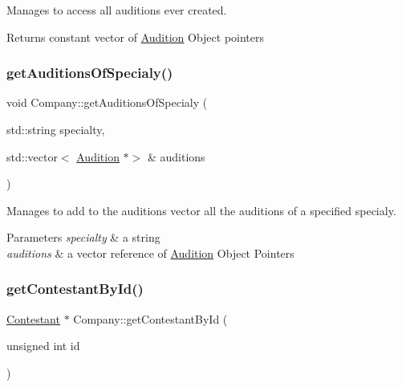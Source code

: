 Manages to access all auditions ever created. 

\begin{DoxyReturn}{Returns}
constant vector of \hyperlink{class_audition}{Audition} Object pointers 
\end{DoxyReturn}
\mbox{\label{class_company_a9740e4c34fac69951145e289269fabdb}} 
\subsubsection{\texorpdfstring{get\+Auditions\+Of\+Specialy()}{getAuditionsOfSpecialy()}}
{\footnotesize\ttfamily void Company\+::get\+Auditions\+Of\+Specialy (\begin{DoxyParamCaption}\item[{std\+::string}]{specialty,  }\item[{std\+::vector$<$ \hyperlink{class_audition}{Audition} $\ast$$>$ \&}]{auditions }\end{DoxyParamCaption})}



Manages to add to the auditions vector all the auditions of a specified specialy. 


\begin{DoxyParams}{Parameters}
{\em specialty} & a string \\
\hline
{\em auditions} & a vector reference of \hyperlink{class_audition}{Audition} Object Pointers \\
\hline
\end{DoxyParams}
\mbox{\label{class_company_a9a633866abe6cc598bb290498dc3d7ad}} 
\subsubsection{\texorpdfstring{get\+Contestant\+By\+Id()}{getContestantById()}}
{\footnotesize\ttfamily \hyperlink{class_contestant}{Contestant} $\ast$ Company\+::get\+Contestant\+By\+Id (\begin{DoxyParamCaption}\item[{unsigned int}]{id }\end{DoxyParamCaption})}



